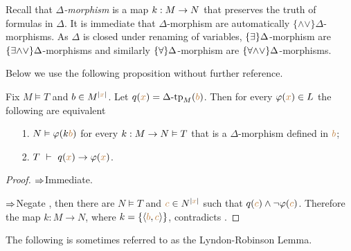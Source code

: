 Recall that \emph{$\Delta$-morphism\/} is a map $k:M\rightarrow N$ that preserves the truth of formulas in $\Delta$. It is immediate that $\Delta$-morphism are automatically $\{\mathord\wedge\mathord\vee\}\Delta$-morphisms. As $\Delta$ is closed under renaming of variables, $\{\exists\}\Delta$-morphism are $\{\exists\mathord\wedge\mathord\vee\}\Delta$-morphisms and similarly $\{\forall\}\Delta$-morphism are $\{\forall\mathord\wedge\mathord\vee\}\Delta$-morphisms.

Below we use the following proposition without further reference.

\begin{proposition}\label{prop_pokj}
Fix $M\models T$ and $b\in M^{|{\color{brown} x}|}$. Let $q({\color{brown} x})=\Delta\mbox{-}\textrm{tp}_M({\color{brown} b})$. Then for every $\varphi({\color{brown} x})\in L$ the following are equivalent
\begin{itemize}
\item[1.] $N\vDash\varphi(k{\color{brown} b})$ for every $k:M\rightarrow N\vDash T$ that is a $\Delta$-morphism defined in ${\color{brown} b}$;
\item[2.] $T\ \proves\  q({\mr x})\imp\phi({\mr x})$.
\end{itemize}
\end{proposition}
\begin{proof}$\Rightarrow$\quad Immediate.  

$\Rightarrow$\quad Negate , then there are $N\models T$ and ${\color{brown} c}\in N^{|{\color{brown} x}|}$ such that $q({\color{brown} c})\wedge\neg\varphi({\color{brown} c})$. Therefore the map $k:M\to N$, where $k=\{\langle{\color{brown}b},{\color{brown} c}\rangle\}$, contradicts .
\end{proof}

The following is sometimes referred to as the Lyndon-Robinson Lemma.

